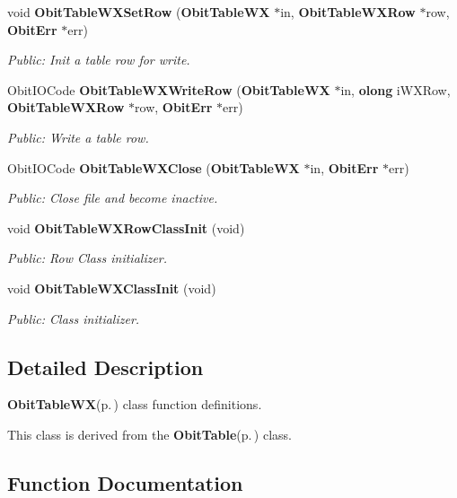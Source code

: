 \begin{CompactItemize}
void {\bf Obit\-Table\-WXSet\-Row} ({\bf Obit\-Table\-WX} $\ast$in, {\bf Obit\-Table\-WXRow} $\ast$row, {\bf Obit\-Err} $\ast$err)
\begin{CompactList}\small\item\em Public: Init a table row for write. \item\end{CompactList}\item 
Obit\-IOCode {\bf Obit\-Table\-WXWrite\-Row} ({\bf Obit\-Table\-WX} $\ast$in, {\bf olong} i\-WXRow, {\bf Obit\-Table\-WXRow} $\ast$row, {\bf Obit\-Err} $\ast$err)
\begin{CompactList}\small\item\em Public: Write a table row. \item\end{CompactList}\item 
Obit\-IOCode {\bf Obit\-Table\-WXClose} ({\bf Obit\-Table\-WX} $\ast$in, {\bf Obit\-Err} $\ast$err)
\begin{CompactList}\small\item\em Public: Close file and become inactive. \item\end{CompactList}\item 
void {\bf Obit\-Table\-WXRow\-Class\-Init} (void)
\begin{CompactList}\small\item\em Public: Row Class initializer. \item\end{CompactList}\item 
void {\bf Obit\-Table\-WXClass\-Init} (void)
\begin{CompactList}\small\item\em Public: Class initializer. \item\end{CompactList}\end{CompactItemize}


\subsection{Detailed Description}
{\bf Obit\-Table\-WX}{\rm (p.\,\pageref{structObitTableWX})} class function definitions. 

This class is derived from the {\bf Obit\-Table}{\rm (p.\,\pageref{structObitTable})} class.

\subsection{Function Documentation}
